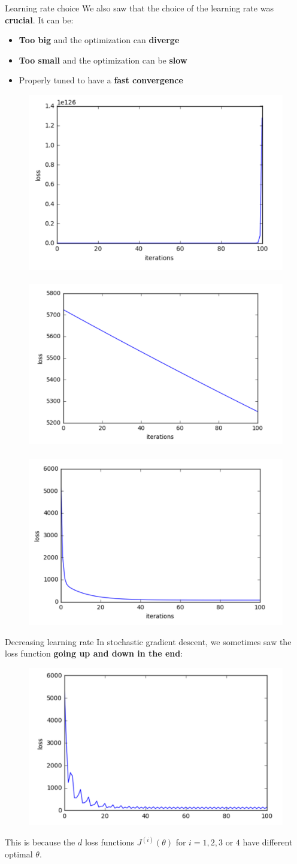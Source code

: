 \documentclass{beamer}
\newcommand{\1}[1]{\mathbbm{1}\left[#1\right]}
\begin{document}
\begin{frame}{Learning rate choice}
We also saw that the choice of the learning rate was \textbf{crucial}. It can be:
\begin{itemize}
	\item \textbf{Too big} and the optimization can \textbf{diverge}
	\item \textbf{Too small} and the optimization can be \textbf{slow}
	\item Properly tuned to have a \textbf{fast convergence}
\end{itemize}
\begin{figure}
\centering
\includegraphics[width=.3\linewidth]{images/alpha_big.png}~
\includegraphics[width=.3\linewidth]{images/alpha_small.png}~
\includegraphics[width=.3\linewidth]{images/alpha_ok.png}
\end{figure}
\end{frame}

\begin{frame}{Decreasing learning rate}
In stochastic gradient descent, we sometimes saw the loss function \textbf{going up and down in the end}: 
\begin{figure}
\centering
\includegraphics[width=.8\linewidth]{images/sgd_constant_alpha.png}
\end{figure}
This is because the $d$ loss functions $J^{(i)}(\theta)$ for $i = 1, 2, 3 \text{~or~} 4$ have different optimal $\theta$.
\end{frame}
\end{document}
